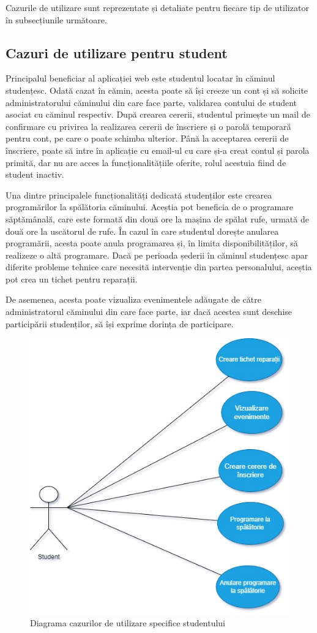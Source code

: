 \documentclass[12pt,a4paper]{report}
\theoremstyle{definition}
\theoremstyle{remark}
\begin{document}
\par Cazurile de utilizare sunt reprezentate și detaliate pentru fiecare tip de utilizator în subsecțiunile următoare.

\subsection{Cazuri de utilizare pentru student}
\par Principalul beneficiar al aplicației web este studentul locatar în căminul studențesc. Odată cazat în cămin, acesta poate să își creeze un cont și să solicite administratorului căminului din care face parte, validarea contului de student asociat cu căminul respectiv. După crearea cererii, studentul primește un mail de confirmare cu privirea la realizarea cererii de înscriere și o parolă temporară pentru cont, pe care o poate schimba ulterior. Până la acceptarea cererii de înscriere, poate să intre în aplicație cu email-ul cu care și-a creat contul și parola primită, dar nu are acces la funcționalitățiile oferite, rolul acestuia fiind de student inactiv.

\par Una dintre principalele funcționalități dedicată studenților este crearea \textnormal{pro\-gra\-mă\-ri\-lor} la spălătoria căminului. Aceștia pot beneficia de o programare săptămânală, care este formată din două ore la mașina de spălat rufe, urmată de două ore la uscătorul de rufe. În cazul în care studentul dorește anularea programării, acesta poate anula programarea și, în limita disponibilităților, să realizeze o altă programare. Dacă pe perioada șederii în căminul studențesc apar diferite probleme tehnice care necesită intervenție din partea personalului, aceștia pot crea un tichet pentru reparații.

\par De asemenea, acesta poate vizualiza evenimentele adăugate de către administratorul căminului din care face parte, iar dacă acestea sunt deschise participării studenților, să își exprime dorința de participare. 

\begin{figure}[H]
    \centering
    \includegraphics[width=0.6\linewidth,height=0.4\textheight]{resurse/diagrame/UVTDors_UseCaseStudent.jpg}
    \caption{Diagrama cazurilor de utilizare specifice studentului}
\end{figure}
\end{document}
